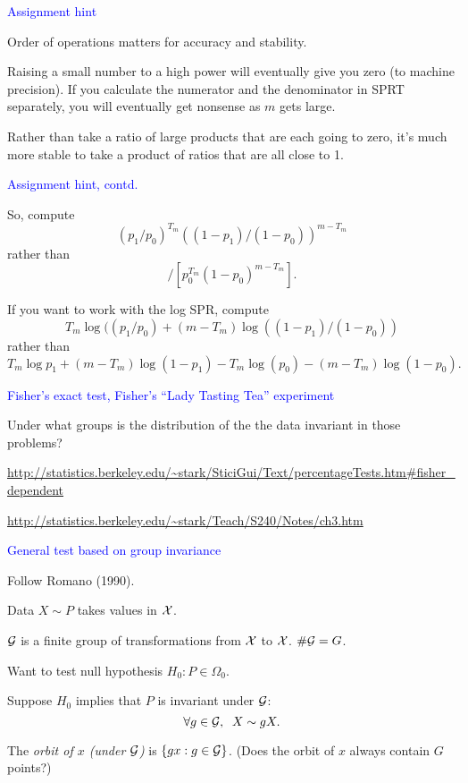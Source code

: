 \documentclass[landscape]{slides}
\newcommand{\cG}{{\cal G}}
\newcommand{\cX}{{\cal X}}
\newcommand{\beq}{\begin{equation}}
\newcommand{\eeq}{\end{equation}}
\begin{document}
\begin{slide}
{\textcolor{blue}{Assignment hint}}

Order of operations matters for accuracy and stability.  

Raising a small number to a high power will eventually give you zero (to machine precision).
If you calculate the numerator and the denominator in SPRT separately, you will eventually
get nonsense as $m$ gets large.

Rather than take a ratio of large products that are each going to zero, it's much 
more stable to take a product of ratios that are all close to 1.

\end{slide}

\begin{slide}
{\textcolor{blue}{Assignment hint, contd.}}

So, compute
\beq
    (p_1/p_0)^{T_m} ((1-p_1)/(1-p_0))^{m-T_m}
 \eeq 
 rather than
 \beq
    [p_1^{T_m} (1-p_1)^{m-T_m}]/[p_0^{T_m} (1-p_0)^{m-T_m}].
 \eeq

If you want to work with the log SPR, compute 
\beq
    T_m \log((p_1/p_0) + (m-T_m) \log((1-p_1)/(1-p_0))
\eeq
rather than
\beq
 T_m \log p_1 + (m-T_m) \log(1-p_1)  - T_m \log(p_0) - (m-T_m) \log(1-p_0).
 \eeq


\end{slide}

\begin{slide}
{\textcolor{blue}{Fisher's exact test, Fisher's ``Lady Tasting Tea'' experiment}}

Under what groups is the distribution of the the data invariant in those problems?

\url{http://statistics.berkeley.edu/~stark/SticiGui/Text/percentageTests.htm#fisher_dependent}

\url{http://statistics.berkeley.edu/~stark/Teach/S240/Notes/ch3.htm}


\end{slide}

\begin{slide}
{\textcolor{blue}{General test based on group invariance}}

Follow Romano (1990).

Data $X \sim P$ takes values in $\cX$.

$\cG$ is a finite group of transformations from $\cX$ to $\cX$.
$\# \cG = G$.

Want to test null hypothesis $H_0: P \in \Omega_0$.

Suppose $H_0$ implies that $P$ is invariant under $\cG$:
\beq
   \forall g \in \cG, \;\; X \sim gX.
\eeq

The {\em orbit of $x$ (under $\cG$)\/} is $\{ gx : g \in \cG \}$.
(Does the orbit of $x$ always contain $G$ points?)

\end{slide}
\end{document}
